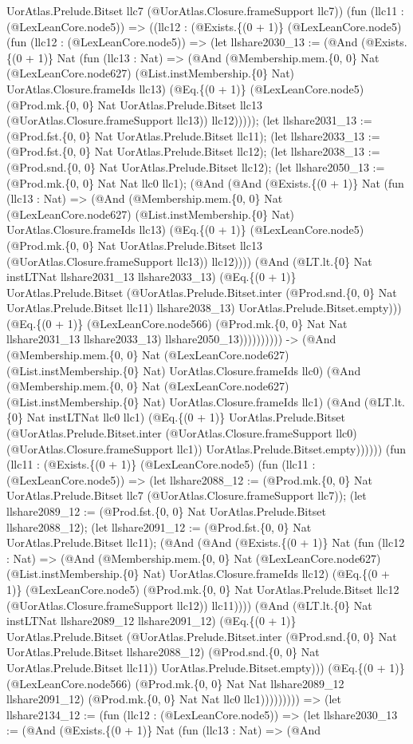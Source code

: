 \documentclass[11pt]{article}
\begin{document}
UorAtlas.Prelude.Bitset llc7 (@UorAtlas.Closure.frameSupport llc7)) (fun (llc11 : (@LexLeanCore.node5)) => ((llc12 : (@Exists.\{(0 + 1)\} (@LexLeanCore.node5) (fun (llc12 : (@LexLeanCore.node5)) => (let llshare2030\_13 := (@And (@Exists.\{(0 + 1)\} Nat (fun (llc13 : Nat) => (@And (@Membership.mem.\{0, 0\} Nat (@LexLeanCore.node627) (@List.instMembership.\{0\} Nat) UorAtlas.Closure.frameIds llc13) (@Eq.\{(0 + 1)\} (@LexLeanCore.node5) (@Prod.mk.\{0, 0\} Nat UorAtlas.Prelude.Bitset llc13 (@UorAtlas.Closure.frameSupport llc13)) llc12))))); (let llshare2031\_13 := (@Prod.fst.\{0, 0\} Nat UorAtlas.Prelude.Bitset llc11); (let llshare2033\_13 := (@Prod.fst.\{0, 0\} Nat UorAtlas.Prelude.Bitset llc12); (let llshare2038\_13 := (@Prod.snd.\{0, 0\} Nat UorAtlas.Prelude.Bitset llc12); (let llshare2050\_13 := (@Prod.mk.\{0, 0\} Nat Nat llc0 llc1); (@And (@And (@Exists.\{(0 + 1)\} Nat (fun (llc13 : Nat) => (@And (@Membership.mem.\{0, 0\} Nat (@LexLeanCore.node627) (@List.instMembership.\{0\} Nat) UorAtlas.Closure.frameIds llc13) (@Eq.\{(0 + 1)\} (@LexLeanCore.node5) (@Prod.mk.\{0, 0\} Nat UorAtlas.Prelude.Bitset llc13 (@UorAtlas.Closure.frameSupport llc13)) llc12)))) (@And (@LT.lt.\{0\} Nat instLTNat llshare2031\_13 llshare2033\_13) (@Eq.\{(0 + 1)\} UorAtlas.Prelude.Bitset (@UorAtlas.Prelude.Bitset.inter (@Prod.snd.\{0, 0\} Nat UorAtlas.Prelude.Bitset llc11) llshare2038\_13) UorAtlas.Prelude.Bitset.empty))) (@Eq.\{(0 + 1)\} (@LexLeanCore.node566) (@Prod.mk.\{0, 0\} Nat Nat llshare2031\_13 llshare2033\_13) llshare2050\_13)))))))))) -> (@And (@Membership.mem.\{0, 0\} Nat (@LexLeanCore.node627) (@List.instMembership.\{0\} Nat) UorAtlas.Closure.frameIds llc0) (@And (@Membership.mem.\{0, 0\} Nat (@LexLeanCore.node627) (@List.instMembership.\{0\} Nat) UorAtlas.Closure.frameIds llc1) (@And (@LT.lt.\{0\} Nat instLTNat llc0 llc1) (@Eq.\{(0 + 1)\} UorAtlas.Prelude.Bitset (@UorAtlas.Prelude.Bitset.inter (@UorAtlas.Closure.frameSupport llc0) (@UorAtlas.Closure.frameSupport llc1)) UorAtlas.Prelude.Bitset.empty)))))) (fun (llc11 : (@Exists.\{(0 + 1)\} (@LexLeanCore.node5) (fun (llc11 : (@LexLeanCore.node5)) => (let llshare2088\_12 := (@Prod.mk.\{0, 0\} Nat UorAtlas.Prelude.Bitset llc7 (@UorAtlas.Closure.frameSupport llc7)); (let llshare2089\_12 := (@Prod.fst.\{0, 0\} Nat UorAtlas.Prelude.Bitset llshare2088\_12); (let llshare2091\_12 := (@Prod.fst.\{0, 0\} Nat UorAtlas.Prelude.Bitset llc11); (@And (@And (@Exists.\{(0 + 1)\} Nat (fun (llc12 : Nat) => (@And (@Membership.mem.\{0, 0\} Nat (@LexLeanCore.node627) (@List.instMembership.\{0\} Nat) UorAtlas.Closure.frameIds llc12) (@Eq.\{(0 + 1)\} (@LexLeanCore.node5) (@Prod.mk.\{0, 0\} Nat UorAtlas.Prelude.Bitset llc12 (@UorAtlas.Closure.frameSupport llc12)) llc11)))) (@And (@LT.lt.\{0\} Nat instLTNat llshare2089\_12 llshare2091\_12) (@Eq.\{(0 + 1)\} UorAtlas.Prelude.Bitset (@UorAtlas.Prelude.Bitset.inter (@Prod.snd.\{0, 0\} Nat UorAtlas.Prelude.Bitset llshare2088\_12) (@Prod.snd.\{0, 0\} Nat UorAtlas.Prelude.Bitset llc11)) UorAtlas.Prelude.Bitset.empty))) (@Eq.\{(0 + 1)\} (@LexLeanCore.node566) (@Prod.mk.\{0, 0\} Nat Nat llshare2089\_12 llshare2091\_12) (@Prod.mk.\{0, 0\} Nat Nat llc0 llc1))))))))) => (let llshare2134\_12 := (fun (llc12 : (@LexLeanCore.node5)) => (let llshare2030\_13 := (@And (@Exists.\{(0 + 1)\} Nat (fun (llc13 : Nat) => (@And 
\end{document}
